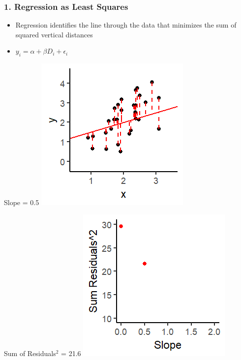 \documentclass[xcolor=x11names,compress]{beamer}\usepackage[]{graphicx}\usepackage[]{color}
\makeatletter
\def\maxwidth{ %
  \ifdim\Gin@nat@width>\linewidth
    \linewidth
  \else
    \Gin@nat@width
  \fi
}
\newenvironment{knitrout}{}{} %
\renewcommand{\(}{\begin{columns}}
\renewcommand{\)}{\end{columns}}
\newcommand{\<}[1]{\begin{column}{#1}}
\renewcommand{\>}{\end{column}}
\makeatother
\begin{document}
\begin{frame}
\frametitle{1. Regression as Least Squares}
\begin{itemize}
\item Regression identifies the line through the data that minimizes the sum of squared vertical distances 
\item $y_i = \alpha + \beta D_i + \epsilon_i$
\end{itemize}
\begin{multicols}{2}
Slope = 0.5
\begin{knitrout}
\color{fgcolor}
\includegraphics[width=\maxwidth]{figure/graph_ols2-1} 

\end{knitrout}
\columnbreak
Sum of Residuals$^2$ = 21.6
\begin{knitrout}
\color{fgcolor}
\includegraphics[width=\maxwidth]{figure/graph_ssr2-1} 

\end{knitrout}
\end{multicols}
\end{frame}
\end{document}
